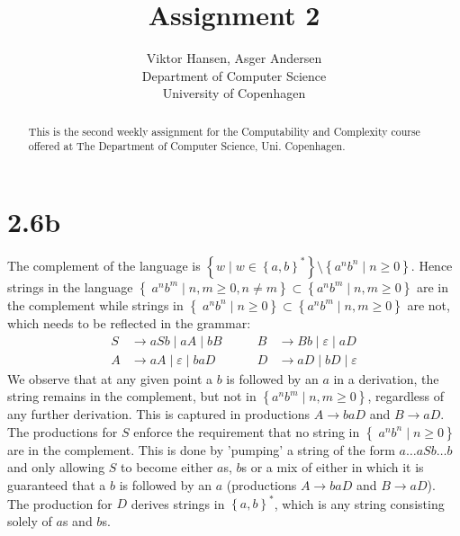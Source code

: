 \documentclass[12pt]{article}
\begin{document}
\nocite{*}


\title{Assignment 2}

\author{Viktor Hansen, Asger Andersen \\ 
Department of Computer Science \\
University of Copenhagen}

\maketitle

\begin{abstract}
  This is the second weekly assignment for the Computability and Complexity course offered at The Department of Computer Science, Uni. Copenhagen.
\end{abstract}

\pagebreak

\section*{2.6b}
The complement of the language is $\left\{ w \; | \; w \in \left\{ a, b \right\}^* \right\} \setminus \left\{ a^nb^n \; | \; n \geq 0 \right\}$. Hence strings in the language $\left\{ \; a^nb^m \; | \; n,m \geq 0, n \neq m \right\} \subset \left\{ a^nb^m \; | \; n,m \geq 0 \right\}$ are in the complement while strings in $\left\{ \; a^nb^n \; | \; n \geq 0 \right\} \subset \left\{ a^nb^m \; | \; n,m \geq 0 \right\}$ are not, which needs to be reflected in the grammar:
\begin{equation*}
	\begin{split}
S &\longrightarrow aSb \; | \; aA \; | \; bB\\
A &\longrightarrow aA \; | \; \varepsilon \; | \; baD
	\end{split}
\quad\quad
	\begin{split}
B &\longrightarrow Bb \; | \; \varepsilon \; | \; aD\\
D &\longrightarrow aD \; | \; bD \; | \; \varepsilon
	\end{split}
\end{equation*}
We observe that at any given point a $b$ is followed by an $a$ in a derivation, the string remains in the complement, but not in $\left\{ a^nb^m \; | \; n,m \geq 0 \right\}$, regardless of any further derivation. This is captured in productions $A \rightarrow baD$ and $B \rightarrow aD$. The productions for $S$ enforce the requirement that no string in $\left\{ \; a^nb^n \; | \; n \geq 0 \right\}$ are in the complement. This is done by 'pumping' a string of the form $a \hdots a S b \hdots b$ and only allowing $S$ to become either $a$s, $b$s or a mix of either in which it is guaranteed that a $b$ is followed by an $a$ (productions $A \rightarrow baD$ and $B \rightarrow aD$). The production for $D$ derives strings in $\left\{a,b\right\}^{*}$, which is any string consisting solely of $a$s and $b$s.
\end{document}
